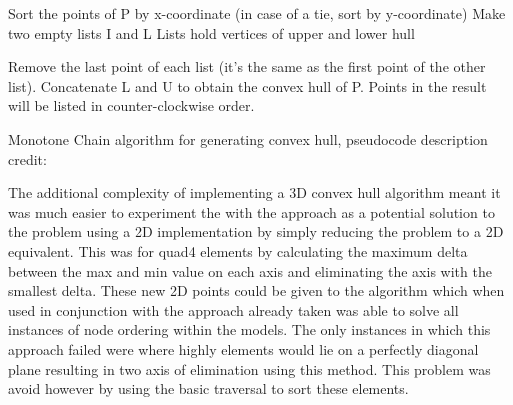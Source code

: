 \begin{algorithm}[H]



	Sort the points of P by x-coordinate (in case of a tie, sort by y-coordinate)\;
	Make two empty lists I and L
	Lists hold vertices of upper and lower hull\;
	
	
	
Remove the last point of each list (it's the same as the first point of the other list).\;
Concatenate L and U to obtain the convex hull of P.\;
Points in the result will be listed in counter-clockwise order.\;

\caption{Monotone Chain algorithm for generating convex hull, pseudocode description credit: \cite{MonotoneChain}}\label{MonotoneChain}
\end{algorithm}




\noindent
\newline


\noindent
The additional complexity of implementing a 3D convex hull algorithm meant it was much easier to experiment the with the approach as a potential solution to the problem using a 2D implementation by simply reducing the problem to a 2D equivalent. This was for quad4 elements by calculating the maximum delta between the max and min value on each axis and eliminating the axis with the smallest delta. These new 2D points could be given to the algorithm which when used in conjunction with the approach already taken was able to solve all instances of node ordering within the models. The only instances in which this approach failed were where highly elements would lie on a perfectly diagonal plane resulting in two axis of elimination using this method. This problem was avoid however by using the basic traversal to sort these elements. \\ 



